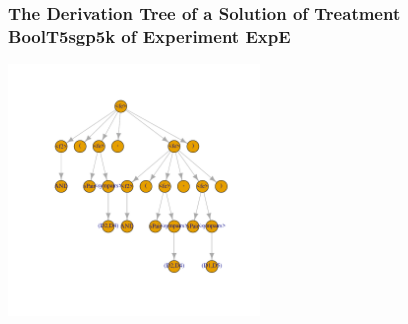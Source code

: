  \begin{frame}
 \frametitle{ The Derivation Tree of a Solution of Treatment BoolT5sgp5k of Experiment ExpE }
 \begin{center}
\includegraphics[width=0.5\textwidth, angle=0]
{ExpEDerivationTreeFigure008.pdf}
 \end{center}
 \label{report/ExpEDerivationTreeFigure008.pdf}  
 \end{frame}

